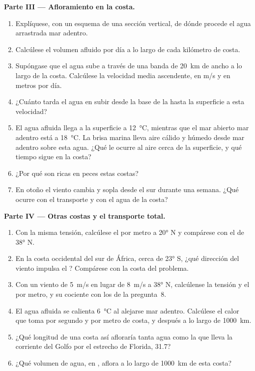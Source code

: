 \begin{problem}
\medskip
\noindent\textbf{Parte III --- Afloramiento en la costa.}
\begin{enumerate}[resume]
  \item Explíquese, con un esquema de una sección vertical, de dónde procede el agua arrastrada mar adentro.
  \item Calcúlese el volumen afluido por día a lo largo de cada kilómetro de costa.
  \item Supóngase que el agua sube a través de una banda de \qty{20}{km} de ancho a lo largo de la costa. Calcúlese la velocidad media ascendente, en \unit{m/s} y en metros por día.
  \item ¿Cuánto tarda el agua en subir desde la base de la  hasta la superficie a esta velocidad?
  \item El agua afluida llega a la superficie a \qty{12}{\celsius}, mientras que el mar abierto mar adentro está a \qty{18}{\celsius}. La brisa marina lleva aire cálido y húmedo desde mar adentro sobre esta agua. ¿Qué le ocurre al aire cerca de la superficie, y qué tiempo sigue en la costa?
  \item ¿Por qué son ricas en peces estas costas?
  \item En otoño el viento cambia y sopla desde el sur durante una semana. ¿Qué ocurre con el transporte y con el agua de la costa?
\end{enumerate}

\medskip
\noindent\textbf{Parte IV --- Otras costas y el transporte total.}
\begin{enumerate}[resume]
  \item Con la misma tensión, calcúlese el  por metro a \ang{20} N y compárese con el de \ang{38} N.
  \item En la costa occidental del sur de África, cerca de \ang{23} S, ¿qué dirección del viento impulsa el ? Compárese con la costa del problema.
  \item Con un viento de \qty{5}{m/s} en lugar de \qty{8}{m/s} a \ang{38} N, calcúlense la tensión y el  por metro, y su cociente con los de la pregunta~8.
  \item El agua afluida se calienta \qty{6}{\celsius} al alejarse mar adentro. Calcúlese el calor que toma por segundo y por metro de costa, y después a lo largo de \qty{1000}{km}.
  \item ¿Qué longitud de una costa así afloraría tanta agua como la que lleva la corriente del Golfo por el estrecho de Florida, \qty{31.7}{\sverdrup}?
  \item ¿Qué volumen de agua, en , aflora a lo largo de \qty{1000}{km} de esta costa?
\end{enumerate}
\end{problem}
